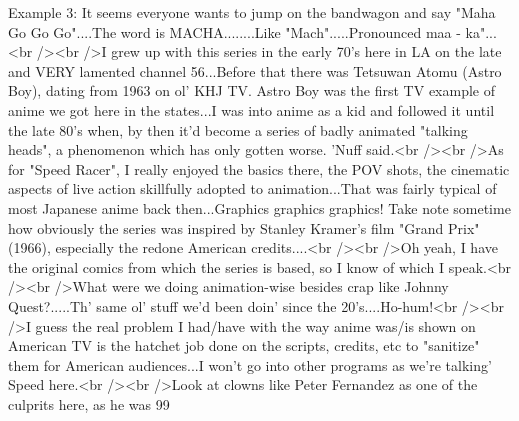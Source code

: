 \begin{simplechar}
Example 3:
It seems everyone wants to jump on the bandwagon and say "Maha Go Go Go"....The word is MACHA........Like "Mach".....Pronounced maa - ka"...<br /><br />I grew up with this series in the early 70's here in LA on the late and VERY lamented channel 56...Before that there was Tetsuwan Atomu (Astro Boy), dating from 1963 on ol' KHJ TV. Astro Boy was the first TV example of anime we got here in the states...I was into anime as a kid and followed it until the late 80's when, by then it'd become a series of badly animated "talking heads", a phenomenon which has only gotten worse. 'Nuff said.<br /><br />As for "Speed Racer", I really enjoyed the basics there, the POV shots, the cinematic aspects of live action skillfully adopted to animation...That was fairly typical of most Japanese anime back then...Graphics graphics graphics! Take note sometime how obviously the series was inspired by Stanley Kramer's film "Grand Prix" (1966), especially the redone American credits....<br /><br />Oh yeah, I have the original comics from which the series is based, so I know of which I speak.<br /><br />What were we doing animation-wise besides crap like Johnny Quest?.....Th' same ol' stuff we'd been doin' since the 20's....Ho-hum!<br /><br />I guess the real problem I had/have with the way anime was/is shown on American TV is the hatchet job done on the scripts, credits, etc to "sanitize" them for American audiences...I won't go into other programs as we're talking' Speed here.<br /><br />Look at clowns like Peter Fernandez as one of the culprits here, as he was 99%


\end{simplechar}
